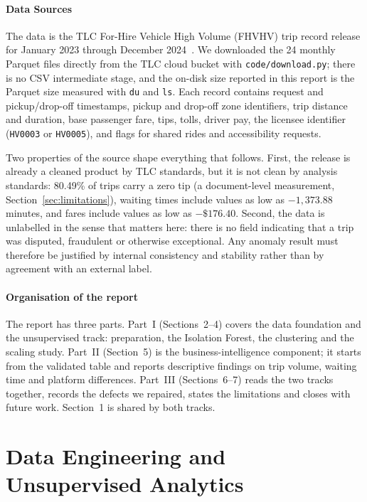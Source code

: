 \documentclass[11pt,a4paper]{article}
\newcommand{\code}[1]{\texttt{\small #1}}
\begin{document}
\subsection{Data Sources}

The data is the TLC For-Hire Vehicle High Volume (FHVHV) trip record release for January 2023 through December 2024~\cite{tlc}. We downloaded the 24 monthly Parquet files directly from the TLC cloud bucket with \code{code/download.py}; there is no CSV intermediate stage, and the on-disk size reported in this report is the Parquet size measured with \code{du} and \code{ls}. Each record contains request and pickup/drop-off timestamps, pickup and drop-off zone identifiers, trip distance and duration, base passenger fare, tips, tolls, driver pay, the licensee identifier (\code{HV0003} or \code{HV0005}), and flags for shared rides and accessibility requests.

Two properties of the source shape everything that follows. First, the release is already a cleaned product by TLC standards, but it is not clean by analysis standards: 80.49\% of trips carry a zero tip (a document-level measurement, Section~\ref{sec:limitations}), waiting times include values as low as $-1{,}373.88$ minutes, and fares include values as low as $-\$176.40$. Second, the data is unlabelled in the sense that matters here: there is no field indicating that a trip was disputed, fraudulent or otherwise exceptional. Any anomaly result must therefore be justified by internal consistency and stability rather than by agreement with an external label.

\subsection{Organisation of the report}

The report has three parts. Part~I (Sections~2--4) covers the data foundation and the unsupervised track: preparation, the Isolation Forest, the clustering and the scaling study. Part~II (Section~5) is the business-intelligence component; it starts from the validated table and reports descriptive findings on trip volume, waiting time and platform differences. Part~III (Sections~6--7) reads the two tracks together, records the defects we repaired, states the limitations and closes with future work. Section~1 is shared by both tracks.

\part{Data Engineering and Unsupervised Analytics}
\end{document}
